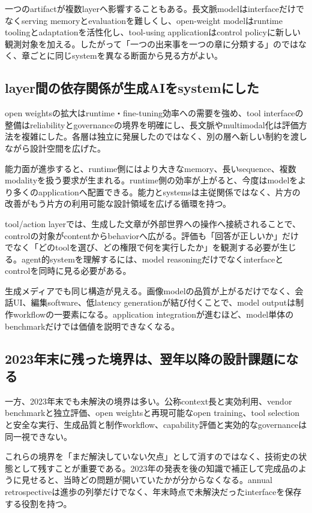 一つのartifactが複数layerへ影響することもある。長文脈modelはinterfaceだけでなくserving memoryとevaluationを難しくし、open-weight modelはruntime toolingとadaptationを活性化し、tool-using applicationはcontrol policyに新しい観測対象を加える。したがって「一つの出来事を一つの章に分類する」のではなく、章ごとに同じsystemを異なる断面から見る方がよい。


\subsection{layer間の依存関係が生成AIをsystemにした}

open weightsの拡大はruntime・fine-tuning効率への需要を強め、tool interfaceの整備はreliabilityとgovernanceの境界を明確にし、長文脈やmultimodal化は評価方法を複雑にした。各層は独立に発展したのではなく、別の層へ新しい制約を渡しながら設計空間を広げた。


能力面が進歩すると、runtime側にはより大きなmemory、長いsequence、複数modalityを扱う要求が生まれる。runtime側の効率が上がると、今度はmodelをより多くのapplicationへ配置できる。能力とsystemsは主従関係ではなく、片方の改善がもう片方の利用可能な設計領域を広げる循環を持つ。


tool/action layerでは、生成した文章が外部世界への操作へ接続されることで、controlの対象がcontentからbehaviorへ広がる。評価も「回答が正しいか」だけでなく「どのtoolを選び、どの権限で何を実行したか」を観測する必要が生じる。agent的systemを理解するには、model reasoningだけでなくinterfaceとcontrolを同時に見る必要がある。


生成メディアでも同じ構造が見える。画像modelの品質が上がるだけでなく、会話UI、編集software、低latency generationが結び付くことで、model outputは制作workflowの一要素になる。application integrationが進むほど、model単体のbenchmarkだけでは価値を説明できなくなる。


\subsection{2023年末に残った境界は、翌年以降の設計課題になる}

一方、2023年末でも未解決の境界は多い。公称context長と実効利用、vendor benchmarkと独立評価、open weightsと再現可能なopen training、tool selectionと安全な実行、生成品質と制作workflow、capability評価と実効的なgovernanceは同一視できない。


これらの境界を「まだ解決していない欠点」として消すのではなく、技術史の状態として残すことが重要である。2023年の発表を後の知識で補正して完成品のように見せると、当時どの問題が開いていたかが分からなくなる。annual retrospectiveは進歩の列挙だけでなく、年末時点で未解決だったinterfaceを保存する役割を持つ。


